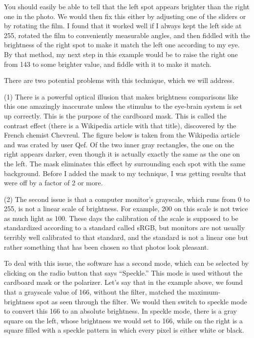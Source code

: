 You should easily be able to tell that the left spot appears brighter than the right
one in the photo. We would then fix this either by adjusting one of the sliders or
by rotating the film. I found that it worked well if I always kept the left side
at 255, rotated the film to conveniently measurable angles, and then fiddled with
the brightness of the right spot to make it match the left one according to my eye.
By that method, my next step in this example would be to raise the right one from
143 to some brighter value, and fiddle with it to make it match.

There are two potential problems with this technique, which we will address.

(1) There is a powerful optical illusion that makes brightness comparisons
like this one amazingly inaccurate unless the stimulus to the eye-brain system
is set up correctly. This is the purpose of the cardboard mask. This is called
the contrast effect (there is a Wikipedia article with that title), discovered
by the French chemist Chevreul.  The figure below is taken from the Wikipedia
article and was crated by user Qef. Of the two inner gray rectangles, the one
on the right appears darker, even though it is actually exactly the same as
the one on the left. The mask eliminates this effect by surrounding each spot
with the same background.
Before I added the mask to my technique, I was getting
results that were off by a factor of 2 or more. 


(2) The second issue is that a computer monitor's grayscale, which runs from 0 to 255,
is not a linear scale of brightness. For example, 200 on this scale is not twice as
much light as 100. These days the calibration of the scale is supposed to be standardized
according to a standard called sRGB, but monitors are not usually terribly well calibrated
to that standard, and the standard is not a linear one but rather something that has
been chosen so that photos look pleasant.

To deal with this issue, the software has a second mode, which can be selected by
clicking on the radio button that says ``Speckle.'' This mode is used without the
cardboard mask or the polarizer. Let's say that in the example above, we found that
a grayscale value of 166, without the filter, matched the maximum-brightness spot
as seen through the filter. We would then switch to speckle mode to convert this 166 to an absolute
brightness. In speckle mode, there is a gray square on the left, whose brightness we
would set to 166, while on the right is a square filled with a speckle pattern in which
every pixel is either white or black. 

